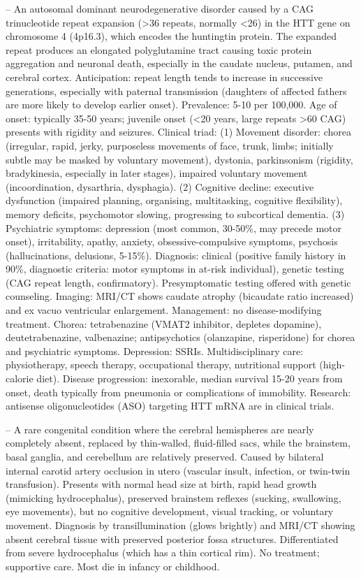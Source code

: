 -- An autosomal dominant neurodegenerative disorder caused by a CAG trinucleotide repeat expansion (>36 repeats, normally <26) in the HTT gene on chromosome 4 (4p16.3), which encodes the huntingtin protein. The expanded repeat produces an elongated polyglutamine tract causing toxic protein aggregation and neuronal death, especially in the caudate nucleus, putamen, and cerebral cortex. Anticipation: repeat length tends to increase in successive generations, especially with paternal transmission (daughters of affected fathers are more likely to develop earlier onset). Prevalence: 5-10 per 100,000. Age of onset: typically 35-50 years; juvenile onset (<20 years, large repeats >60 CAG) presents with rigidity and seizures. Clinical triad: (1) Movement disorder: chorea (irregular, rapid, jerky, purposeless movements of face, trunk, limbs; initially subtle may be masked by voluntary movement), dystonia, parkinsonism (rigidity, bradykinesia, especially in later stages), impaired voluntary movement (incoordination, dysarthria, dysphagia). (2) Cognitive decline: executive dysfunction (impaired planning, organising, multitasking, cognitive flexibility), memory deficits, psychomotor slowing, progressing to subcortical dementia. (3) Psychiatric symptoms: depression (most common, 30-50\%, may precede motor onset), irritability, apathy, anxiety, obsessive-compulsive symptoms, psychosis (hallucinations, delusions, 5-15\%). Diagnosis: clinical (positive family history in 90\%, diagnostic criteria: motor symptoms in at-risk individual), genetic testing (CAG repeat length, confirmatory). Presymptomatic testing offered with genetic counseling. Imaging: MRI/CT shows caudate atrophy (bicaudate ratio increased) and ex vacuo ventricular enlargement. Management: no disease-modifying treatment. Chorea: tetrabenazine (VMAT2 inhibitor, depletes dopamine), deutetrabenazine, valbenazine; antipsychotics (olanzapine, risperidone) for chorea and psychiatric symptoms. Depression: SSRIs. Multidisciplinary care: physiotherapy, speech therapy, occupational therapy, nutritional support (high-calorie diet). Disease progression: inexorable, median survival 15-20 years from onset, death typically from pneumonia or complications of immobility. Research: antisense oligonucleotides (ASO) targeting HTT mRNA are in clinical trials.

-- A rare congenital condition where the cerebral hemispheres are nearly completely absent, replaced by thin-walled, fluid-filled sacs, while the brainstem, basal ganglia, and cerebellum are relatively preserved. Caused by bilateral internal carotid artery occlusion in utero (vascular insult, infection, or twin-twin transfusion). Presents with normal head size at birth, rapid head growth (mimicking hydrocephalus), preserved brainstem reflexes (sucking, swallowing, eye movements), but no cognitive development, visual tracking, or voluntary movement. Diagnosis by transillumination (glows brightly) and MRI/CT showing absent cerebral tissue with preserved posterior fossa structures. Differentiated from severe hydrocephalus (which has a thin cortical rim). No treatment; supportive care. Most die in infancy or childhood.

